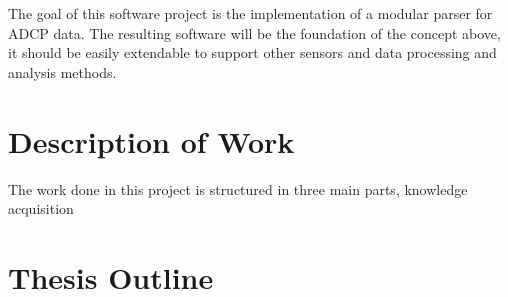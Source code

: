 The goal of this software project is the implementation of a modular parser for ADCP data. The resulting software will be the foundation of the concept above, it should be easily extendable to support other sensors and data processing and analysis methods. 

\section{Description of Work}
The work done in this project is structured in three main parts, knowledge acquisition

\section{Thesis Outline}

